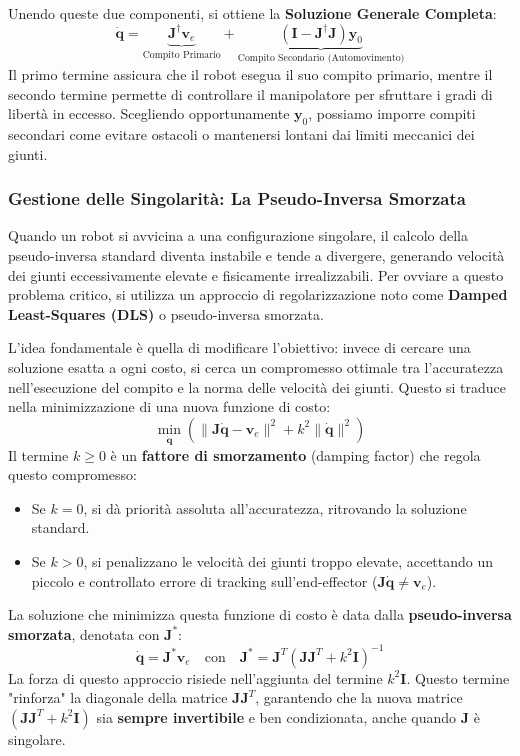 ﻿\documentclass[11pt, a4paper]{article}
\begin{document}
Unendo queste due componenti, si ottiene la \textbf{Soluzione Generale Completa}:
\[
    \dot{\bm{q}} = \underbrace{\bm{J}^{\dagger}\bm{v}_e}_{\text{Compito Primario}} + \underbrace{(\bm{I} - \bm{J}^{\dagger}\bm{J})\bm{y}_0}_{\text{Compito Secondario (Automovimento)}}
\]
Il primo termine assicura che il robot esegua il suo compito primario, mentre il secondo termine permette di controllare il manipolatore per sfruttare i gradi di libertà in eccesso. Scegliendo opportunamente \(\bm{y}_0\), possiamo imporre compiti secondari come evitare ostacoli o mantenersi lontani dai limiti meccanici dei giunti.

\subsubsection{Gestione delle Singolarità: La Pseudo-Inversa Smorzata}
Quando un robot si avvicina a una configurazione singolare, il calcolo della pseudo-inversa standard diventa instabile e tende a divergere, generando velocità dei giunti eccessivamente elevate e fisicamente irrealizzabili. Per ovviare a questo problema critico, si utilizza un approccio di regolarizzazione noto come \textbf{Damped Least-Squares (DLS)} o pseudo-inversa smorzata.

L'idea fondamentale è quella di modificare l'obiettivo: invece di cercare una soluzione esatta a ogni costo, si cerca un compromesso ottimale tra l'accuratezza nell'esecuzione del compito e la norma delle velocità dei giunti. Questo si traduce nella minimizzazione di una nuova funzione di costo:
\[
    \min_{\dot{\bm{q}}} \left( \| \bm{J}\dot{\bm{q}} - \bm{v}_e \|^2 + k^2 \|\dot{\bm{q}}\|^2 \right)
\]
Il termine \(k \ge 0\) è un \textbf{fattore di smorzamento} (damping factor) che regola questo compromesso:
\begin{itemize}
    \item Se \(k=0\), si dà priorità assoluta all'accuratezza, ritrovando la soluzione standard.
    \item Se \(k>0\), si penalizzano le velocità dei giunti troppo elevate, accettando un piccolo e controllato errore di tracking sull'end-effector (\(\bm{J}\dot{\bm{q}} \neq \bm{v}_e\)).
\end{itemize}
La soluzione che minimizza questa funzione di costo è data dalla \textbf{pseudo-inversa smorzata}, denotata con \(\bm{J}^*\):
\[
    \dot{\bm{q}} = \bm{J}^* \bm{v}_e \quad \text{con} \quad \bm{J}^* = \bm{J}^T (\bm{J}\bm{J}^T + k^2\bm{I})^{-1}
\]
La forza di questo approccio risiede nell'aggiunta del termine \(k^2\bm{I}\). Questo termine "rinforza" la diagonale della matrice \(\bm{J}\bm{J}^T\), garantendo che la nuova matrice \((\bm{J}\bm{J}^T + k^2\bm{I})\) sia \textbf{sempre invertibile} e ben condizionata, anche quando \(\bm{J}\) è singolare.
\end{document}
